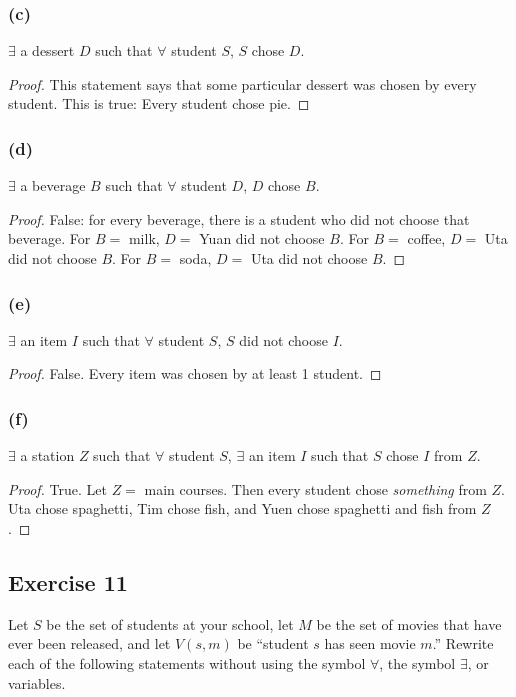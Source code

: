 \documentclass[14pt]{extarticle}
\newcommand{\fa}{\forall}
\newcommand{\te}{\exists}
\begin{document}
\subsubsection{(c)}
$\te$ a dessert $D$ such that $\fa$ student $S$, $S$ chose $D$.

\begin{proof}
    This statement says that some particular dessert was chosen by every student. This is true: Every student chose pie.
\end{proof}

\subsubsection{(d)}
$\te$ a beverage $B$ such that $\fa$ student $D$, $D$ chose $B$.

\begin{proof}
    False: for every beverage, there is a student who did not choose that beverage. For $B = $ milk, $D = $ Yuan did not choose $B$. For $B = $ coffee, $D = $ Uta did not choose $B$. For $B = $ soda, $D = $ Uta did not choose $B$.
\end{proof}

\subsubsection{(e)}
$\te$ an item $I$ such that $\fa$ student $S$, $S$ did not choose $I$.

\begin{proof}
    False. Every item was chosen by at least 1 student.
\end{proof}

\subsubsection{(f)}
$\te$ a station $Z$ such that $\fa$ student $S$, $\te$ an item $I$ such that $S$ chose $I$ from $Z$.

\begin{proof}
    True. Let $Z = $ main courses. Then every student chose {\it something} from $Z$. Uta chose spaghetti, Tim chose fish, and Yuen chose spaghetti and fish from $Z$.
\end{proof}

\subsection{Exercise 11}
Let $S$ be the set of students at your school, let $M$ be the set of movies that have ever been released, and let $V(s, m)$ be “student $s$ has seen movie $m$.” Rewrite each of the following statements without using the symbol $\fa$, the symbol $\te$, or variables.
\end{document}
